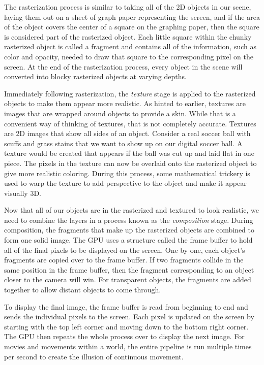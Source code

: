 \documentclass[12pt] {article}
\begin{document}
The rasterization process is similar to taking all of the 2D objects in our scene, laying them out on a sheet of graph paper representing the screen, and if the area of the object covers the center of a square on the graphing paper, then the square is considered part of the rasterized object. Each little square within the chunky rasterized object is called a fragment and contains all of the information, such as color and opacity, needed to draw that square to the corresponding pixel on the screen. At the end of the rasterization process, every object in the scene will converted into blocky rasterized objects at varying depths.

Immediately following rasterization, the \emph{texture} stage is applied to the rasterized objects to make them appear more realistic. As hinted to earlier, textures are images that are wrapped around objects to provide a skin. While that is a convenient way of thinking of textures, that is not completely accurate. Textures are 2D images that show all sides of an object. Consider a real soccer ball with scuffs and grass stains that we want to show up on our digital soccer ball. A texture would be created that appears if the ball was cut up and laid flat in one piece. The pixels in the texture can now be overlaid onto the rasterized object to give more realistic coloring. During this process, some mathematical trickery is used to warp the texture to add perspective to the object and make it appear visually 3D.

Now that all of our objects are in the rasterized and textured to look realistic, we need to combine the layers in a process known as the \emph{composition} stage. During composition, the fragments that make up the rasterized objects are combined to form one solid image. The GPU uses a structure called the frame buffer to hold all of the final pixels to be displayed on the screen. One by one, each object's fragments are copied over to the frame buffer. If two fragments collide in the same position in the frame buffer, then the fragment corresponding to an object closer to the camera will win. For transparent objects, the fragments are added together to allow distant objects to come through.


To display the final image, the frame buffer is read from beginning to end and sends the individual pixels to the screen. Each pixel is updated on the screen by starting with the top left corner and moving down to the bottom right corner. The GPU then repeats the whole process over to display the next image. For movies and movements within a world, the entire pipeline is run multiple times per second to create the illusion of continuous movement.
\end{document}
